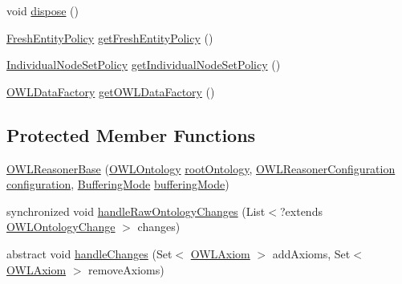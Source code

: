 \begin{DoxyCompactItemize}
\item 
void \hyperlink{classorg_1_1semanticweb_1_1owlapi_1_1reasoner_1_1impl_1_1_o_w_l_reasoner_base_aa9212b843931929a5521423c8a1fd20f}{dispose} ()
\item 
\hyperlink{enumorg_1_1semanticweb_1_1owlapi_1_1reasoner_1_1_fresh_entity_policy}{Fresh\-Entity\-Policy} \hyperlink{classorg_1_1semanticweb_1_1owlapi_1_1reasoner_1_1impl_1_1_o_w_l_reasoner_base_a4f96a064b2eb502e3821c70519908376}{get\-Fresh\-Entity\-Policy} ()
\item 
\hyperlink{enumorg_1_1semanticweb_1_1owlapi_1_1reasoner_1_1_individual_node_set_policy}{Individual\-Node\-Set\-Policy} \hyperlink{classorg_1_1semanticweb_1_1owlapi_1_1reasoner_1_1impl_1_1_o_w_l_reasoner_base_a78671bea00f25ae70a62daf3b500b52c}{get\-Individual\-Node\-Set\-Policy} ()
\item 
\hyperlink{interfaceorg_1_1semanticweb_1_1owlapi_1_1model_1_1_o_w_l_data_factory}{O\-W\-L\-Data\-Factory} \hyperlink{classorg_1_1semanticweb_1_1owlapi_1_1reasoner_1_1impl_1_1_o_w_l_reasoner_base_a3636d9e8d84991ba068a23d90868744b}{get\-O\-W\-L\-Data\-Factory} ()
\end{DoxyCompactItemize}
\subsection*{Protected Member Functions}
\begin{DoxyCompactItemize}
\item 
\hyperlink{classorg_1_1semanticweb_1_1owlapi_1_1reasoner_1_1impl_1_1_o_w_l_reasoner_base_aac52d62dd3c64d7af46f867f7de0e1e6}{O\-W\-L\-Reasoner\-Base} (\hyperlink{interfaceorg_1_1semanticweb_1_1owlapi_1_1model_1_1_o_w_l_ontology}{O\-W\-L\-Ontology} \hyperlink{classorg_1_1semanticweb_1_1owlapi_1_1reasoner_1_1impl_1_1_o_w_l_reasoner_base_a7fc931cb266522a2e131763fb69a02c4}{root\-Ontology}, \hyperlink{interfaceorg_1_1semanticweb_1_1owlapi_1_1reasoner_1_1_o_w_l_reasoner_configuration}{O\-W\-L\-Reasoner\-Configuration} \hyperlink{classorg_1_1semanticweb_1_1owlapi_1_1reasoner_1_1impl_1_1_o_w_l_reasoner_base_a4cbc08a1cf3914d8e9ab79c2236c4a88}{configuration}, \hyperlink{enumorg_1_1semanticweb_1_1owlapi_1_1reasoner_1_1_buffering_mode}{Buffering\-Mode} \hyperlink{classorg_1_1semanticweb_1_1owlapi_1_1reasoner_1_1impl_1_1_o_w_l_reasoner_base_a37f5f012eabc861364519447692648c0}{buffering\-Mode})
\item 
synchronized void \hyperlink{classorg_1_1semanticweb_1_1owlapi_1_1reasoner_1_1impl_1_1_o_w_l_reasoner_base_a5c9d48b73196f8463aea8689fb9e6beb}{handle\-Raw\-Ontology\-Changes} (List$<$?extends \hyperlink{classorg_1_1semanticweb_1_1owlapi_1_1model_1_1_o_w_l_ontology_change}{O\-W\-L\-Ontology\-Change} $>$ changes)
\item 
abstract void \hyperlink{classorg_1_1semanticweb_1_1owlapi_1_1reasoner_1_1impl_1_1_o_w_l_reasoner_base_ae7269b08f4d2a35d2f46133c8bc5b354}{handle\-Changes} (Set$<$ \hyperlink{interfaceorg_1_1semanticweb_1_1owlapi_1_1model_1_1_o_w_l_axiom}{O\-W\-L\-Axiom} $>$ add\-Axioms, Set$<$ \hyperlink{interfaceorg_1_1semanticweb_1_1owlapi_1_1model_1_1_o_w_l_axiom}{O\-W\-L\-Axiom} $>$ remove\-Axioms)
\end{DoxyCompactItemize}
